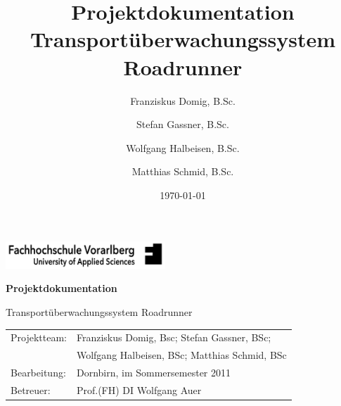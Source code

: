 \documentclass[11pt,a4paper]{article}
\title{
	Projektdokumentation\\
	Transportüberwachungssystem Roadrunner
}
\author{
	Franziskus Domig, B.Sc.\\
		\and
	Stefan Gassner, B.Sc.\\
		\and
	Wolfgang Halbeisen, B.Sc.\\
		\and
	Matthias Schmid, B.Sc.\\	
}
\date{\today}
\begin{document}

\pagestyle{empty} %

\begin{center}

\includegraphics[width=60mm]{files/logo-fhv.png}

\vspace{4cm}
{\large\textbf{Projektdokumentation}}\vspace{.5cm}

{\LARGE Transportüberwachungssystem Roadrunner}

\end{center}

\vspace{13cm}


\begin{tabular}{ll}
Projektteam: & Franziskus Domig, Bsc; Stefan Gassner, BSc;\\
	     & Wolfgang Halbeisen, BSc; Matthias Schmid, BSc\\
Bearbeitung: & Dornbirn, im Sommersemester 2011\\
Betreuer:    & Prof.(FH) DI Wolfgang Auer\\
\end{tabular}


\clearpage
\pagestyle{fancy}
\setcounter{page}{1}



\clearpage
\tableofcontents


\clearpage
{}
\setcounter{page}{1}
\fancyfoot[CO]{\thepage}



\clearpage


\clearpage


\clearpage


\clearpage


\clearpage


\clearpage


\clearpage


\clearpage


\clearpage


\clearpage



\cleardoublepage



\fancyhead[R]{} %
\end{document}

